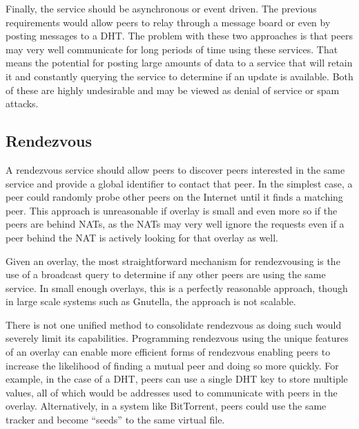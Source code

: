 \documentclass[conference]{IEEEtran}
\begin{document}
Finally, the service should be asynchronous or event driven.  The previous
requirements would allow peers to relay through a message board or even by
posting messages to a DHT.  The problem with these two approaches is that peers
may very well communicate for long periods of time using these services.  That
means the potential for posting large amounts of data to a service that will
retain it and constantly querying the service to determine if an update is
available.  Both of these are highly undesirable and may be viewed as denial of
service or spam attacks.

\subsection{Rendezvous}
\label{rendezvous}

A rendezvous service should allow peers to discover peers interested in the
same service and provide a global identifier to contact that peer.  In the
simplest case, a peer could randomly probe other peers on the Internet until it
finds a matching peer.  This approach is unreasonable if overlay is small and
even more so if the peers are behind NATs, as the NATs may very well ignore the
requests even if a peer behind the NAT is actively looking for that overlay as
well.

Given an overlay, the most straightforward mechanism for rendezvousing is the
use of a broadcast query to determine if any other peers are using the same
service.  In small enough overlays, this is a perfectly reasonable approach,
though in large scale systems such as Gnutella, the approach is not scalable.

There is not one unified method to consolidate rendezvous as doing such would
severely limit its capabilities.  Programming rendezvous using the unique
features of an overlay can enable more efficient forms of rendezvous enabling
peers to increase the likelihood of finding a mutual peer and doing so more
quickly.  For example, in the case of a DHT, peers can use a single DHT key
to store multiple values, all of which would be addresses used to communicate
with peers in the overlay.  Alternatively, in a system like BitTorrent, peers
could use the same tracker and become ``seeds'' to the same virtual file.
\end{document}
